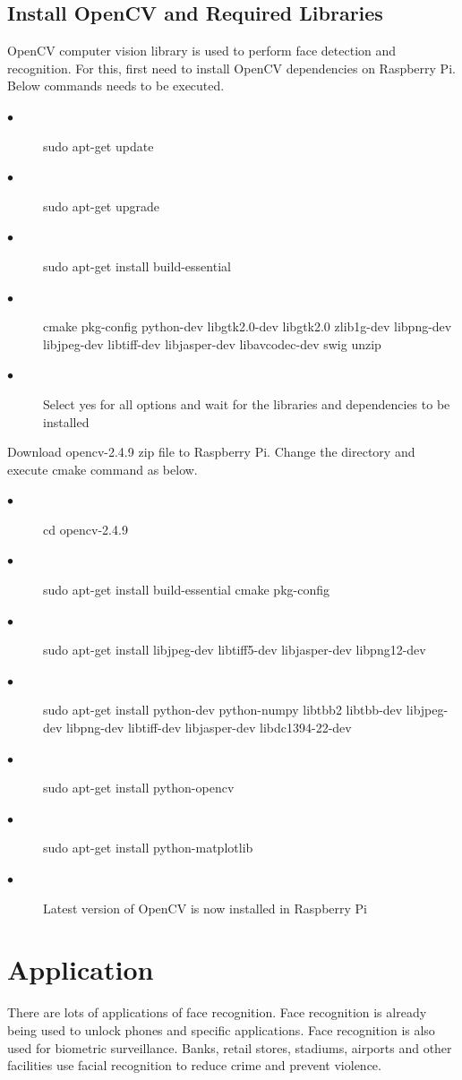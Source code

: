 \documentclass[sigconf]{acmart}
\begin{document}
\subsection{Install OpenCV and Required Libraries}
OpenCV computer vision library is used to perform face detection and recognition. For this, first need to install OpenCV dependencies on Raspberry Pi. Below commands needs to be executed. 
\begin{description}
    \item[$\bullet$] sudo apt-get update
    \item[$\bullet$] sudo apt-get upgrade
    \item[$\bullet$] sudo apt-get install build-essential
    \item[$\bullet$] cmake pkg-config python-dev libgtk2.0-dev libgtk2.0 zlib1g-dev libpng-dev libjpeg-dev libtiff-dev libjasper-dev libavcodec-dev swig unzip
    \item[$\bullet$] Select yes for all options and wait for the libraries and dependencies to be installed
\end{description}
Download opencv-2.4.9 zip file to Raspberry Pi. Change the directory and execute cmake command as below.
\begin{description}
    \item[$\bullet$] cd opencv-2.4.9
    \item[$\bullet$] sudo apt-get install build-essential cmake pkg-config
    \item[$\bullet$] sudo apt-get install libjpeg-dev libtiff5-dev libjasper-dev libpng12-dev
    \item[$\bullet$] sudo apt-get install python-dev python-numpy libtbb2 libtbb-dev libjpeg-dev libpng-dev libtiff-dev libjasper-dev libdc1394-22-dev
    \item[$\bullet$] sudo apt-get install python-opencv
    \item[$\bullet$] sudo apt-get install python-matplotlib
    \item[$\bullet$] Latest version of OpenCV is now installed in Raspberry Pi
\end{description}




\section{Application}
There are lots of applications of face recognition. Face recognition is already being used to unlock phones and specific applications. Face recognition is also used for biometric surveillance. Banks, retail stores, stadiums, airports and other facilities use facial recognition to reduce crime and prevent violence.
\end{document}
